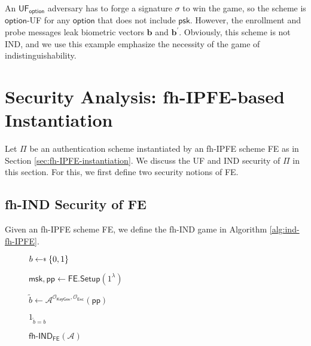 An $\textsf{UF}_\textsf{option}$ adversary has to forge a signature $\sigma$ to win the game, so the scheme is $\textsf{option}$-UF for any $\textsf{option}$ that does not include $\textsf{psk}$. However, the enrollment and probe messages leak biometric vectors $\mathbf{b}$ and $\mathbf{b}^\prime$. Obviously, this scheme is not IND, and we use this example emphasize the necessity of the game of indistinguishability.


\section{Security Analysis: fh-IPFE-based Instantiation}
\label{sec:security_analysis:fh-IPFE}

Let $\Pi$ be an authentication scheme instantiated by an fh-IPFE scheme \textsf{FE} as in Section \ref{sec:fh-IPFE-instantiation}. We discuss the UF and IND security of $\Pi$ in this section. For this, we first define two security notions of \textsf{FE}.

\subsection{fh-IND Security of \textsf{FE}}

Given an fh-IPFE scheme \textsf{FE}, we define the \textsf{fh-IND} game \cite{cryptoeprint:2016/440} in Algorithm \ref{alg:ind-fh-IPFE}.

\begin{figure}[h]
\centering

	\begin{minipage}[t]{0.4\textwidth}
	\begin{algorithm}[H]
	\caption{$\textsf{fh-IND}_{\textsf{FE}}(\mathcal{A})$}
	\label{alg:ind-fh-IPFE}
	\begin{algorithmic}[1]
		\State $b \getsdollar \{0, 1\}$

		\State $\textsf{msk}, \textsf{pp} \gets \textsf{FE.Setup}(1^\lambda)$

		\State $\tilde{b} \gets \mathcal{A}^{\mathcal{O}_{\textsf{KeyGen}}, \mathcal{O}_{\textsf{Enc}}} ( \textsf{pp} )$

		\State \Return $1_{\tilde{b} = b}$
	\end{algorithmic}
	\end{algorithm}
	\end{minipage}

\label{fig:ind-fh-IPFE}
\end{figure}

